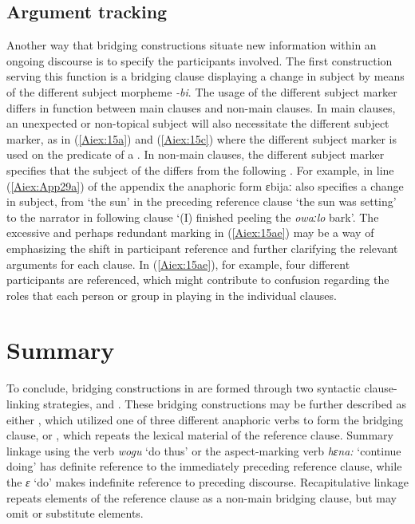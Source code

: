 \documentclass[output=paper]{LSP/langsci}
\begin{document}
\subsection{Argument tracking} 
\label{Aitracking}
Another way that bridging constructions situate new information within an ongoing discourse is to specify the participants involved. The first construction serving this function is a bridging clause displaying a change in subject by means of the different subject morpheme \textit{-bi}. The usage of the different subject marker differs in function between main clauses and non-main clauses. In main clauses, an unexpected or non-topical subject will also necessitate the different subject marker, as in (\ref{Aiex:15a}) and (\ref{Aiex:15c}) where the different subject marker is used on the predicate of a . In non-main clauses, the different subject marker specifies that the subject of the  differs from the following . For example, in line (\ref{Aiex:App29a}) of the appendix the anaphoric form ɛbijaː also specifies a change in subject, from `the sun' in the preceding reference clause `the sun was setting' to the narrator in following clause `(I) finished peeling the \textit{owaːlo} bark'. The excessive and perhaps redundant  marking in (\ref{Aiex:15ae}) may be a way of emphasizing the shift in participant reference and further clarifying the relevant arguments for each clause. In (\ref{Aiex:15ae}), for example, four different participants are referenced, which might contribute to confusion regarding the roles that each person or group in playing in the individual clauses.

\section{Summary} 
\label{AiSumm}
To conclude, bridging constructions in  are formed through two syntactic clause-linking strategies,  and . These bridging constructions may be further described as either , which utilized one of three different anaphoric verbs to form the bridging clause, or , which repeats the lexical material of the reference clause. Summary linkage using the verb \textit{wogu} `do thus' or the aspect-marking verb \textit{hɛna:} `continue doing' has definite reference to the immediately preceding reference clause, while the  \textit{ɛ} `do' makes indefinite reference to preceding discourse. Recapitulative linkage repeats elements of the reference clause as a non-main bridging clause, but may omit or substitute elements. 
\end{document}
